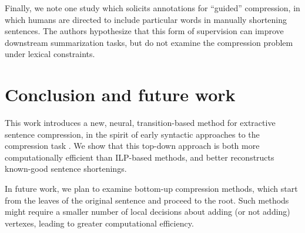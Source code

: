 \documentclass[11pt,a4paper]{article}
\begin{document}
Finally, we note one study \cite{Li2013DocumentSV} which solicits annotations for ``guided'' compression, in which humans are directed to include particular words in manually shortening sentences. The authors hypothesize that this form of supervision can improve downstream summarization tasks, but do not examine the compression problem under lexical constraints.

\section{Conclusion and future work}

This work introduces a new, neural, transition-based method for extractive sentence compression, in the spirit of early syntactic approaches to the compression task \cite{Jing2000SentenceRF,Knight2000StatisticsBasedS}. We show that this top-down approach is both more computationally efficient than ILP-based methods, and better reconstructs known-good sentence shortenings.  

In future work, we plan to examine bottom-up compression methods, which start from the leaves of the original sentence and proceed to the root. Such methods might require a smaller number of local decisions about adding (or not adding) vertexes, leading to greater computational efficiency.




%



\end{document}
